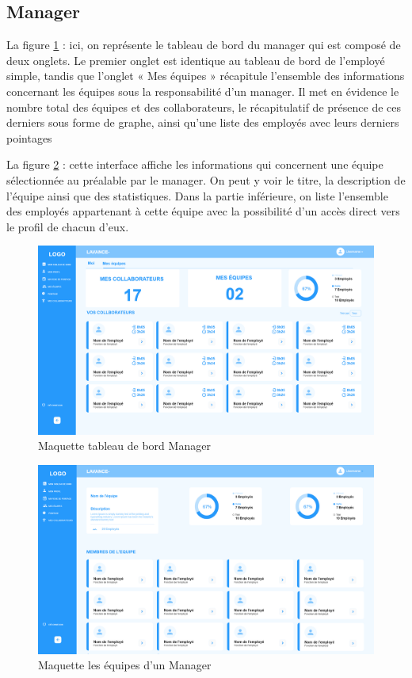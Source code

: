 \subsection{Manager}
La figure \ref{fig8} : ici, on représente le tableau de bord du manager qui est
composé de deux onglets. Le premier onglet est identique au tableau de bord de
l’employé simple, tandis que l’onglet « Mes équipes » récapitule l’ensemble des
informations concernant les équipes sous la responsabilité d’un manager. Il met
en évidence le nombre total des équipes et des collaborateurs, le récapitulatif
de présence de ces derniers sous forme de graphe, ainsi qu’une liste des
employés avec leurs derniers pointages
        
La figure \ref{fig9} : cette interface affiche les informations qui concernent
une équipe sélectionnée au préalable par le manager. On peut y voir le titre, la
description de l’équipe ainsi que des statistiques. Dans la partie inférieure,
on liste l’ensemble des employés appartenant à cette équipe avec la possibilité
d’un accès direct vers le profil de chacun d’eux.

\begin{figure}[h!]
    \centering
    \includegraphics[width=18cm]{images/dash_man_my_teams.png}
    \caption{Maquette tableau de bord Manager}
    \label{fig8}
\end{figure}

\clearpage

\begin{figure}[h!]
    \centering
    \includegraphics[width=18cm]{images/my_team.png}
    \caption{Maquette les équipes d'un Manager}
    \label{fig9}
\end{figure}


